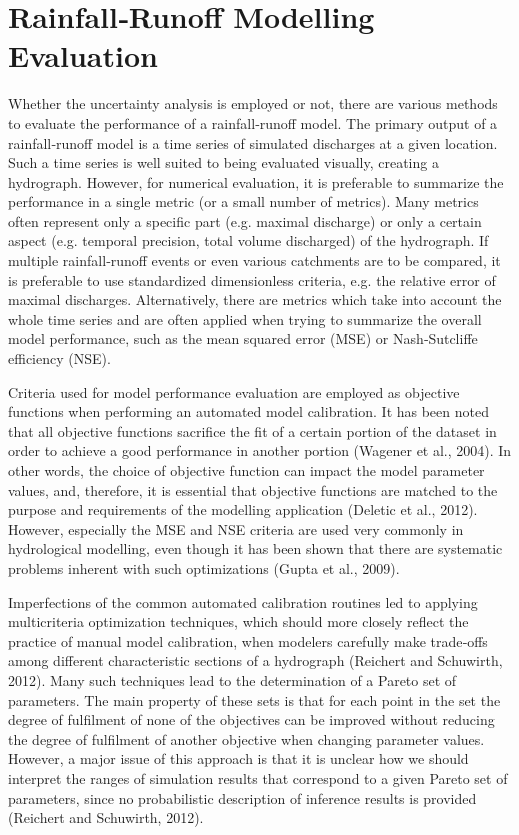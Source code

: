 \documentclass{ctuthesis}\usepackage[]{graphicx}\usepackage[]{color}
\begin{document}
\section{Rainfall‐Runoff Modelling Evaluation}

Whether the uncertainty analysis is employed or not, there are various methods to evaluate the
performance of a rainfall‐runoff model. The primary output of a rainfall‐runoff model is a time series
of simulated discharges at a given location. Such a time series is well suited to being evaluated
visually, creating a hydrograph. However, for numerical evaluation, it is preferable to summarize the
performance in a single metric (or a small number of metrics). Many metrics often represent only a
specific part (e.g. maximal discharge) or only a certain aspect (e.g. temporal precision, total volume
discharged) of the hydrograph. If multiple rainfall‐runoff events or even various catchments are to be
compared, it is preferable to use standardized dimensionless criteria, e.g. the relative error of
maximal discharges. Alternatively, there are metrics which take into account the whole time series
and are often applied when trying to summarize the overall model performance, such as the mean
squared error (MSE) or Nash‐Sutcliffe efficiency (NSE).

Criteria used for model performance evaluation are employed as objective functions when
performing an automated model calibration. It has been noted that all objective functions sacrifice
the fit of a certain portion of the dataset in order to achieve a good performance in another portion
(Wagener et al., 2004). In other words, the choice of objective function can impact the model
parameter values, and, therefore, it is essential that objective functions are matched to the purpose
and requirements of the modelling application (Deletic et al., 2012). However, especially the MSE
and NSE criteria are used very commonly in hydrological modelling, even though it has been shown
that there are systematic problems inherent with such optimizations (Gupta et al., 2009).

Imperfections of the common automated calibration routines led to applying multicriteria
optimization techniques, which should more closely reflect the practice of manual model calibration,
when modelers carefully make trade‐offs among different characteristic sections of a hydrograph
(Reichert and Schuwirth, 2012). Many such techniques lead to the determination of a Pareto set of
parameters. The main property of these sets is that for each point in the set the degree of fulfilment
of none of the objectives can be improved without reducing the degree of fulfilment of another
objective when changing parameter values. However, a major issue of this approach is that it is
unclear how we should interpret the ranges of simulation results that correspond to a given Pareto
set of parameters, since no probabilistic description of inference results is provided (Reichert and
Schuwirth, 2012).
\end{document}
